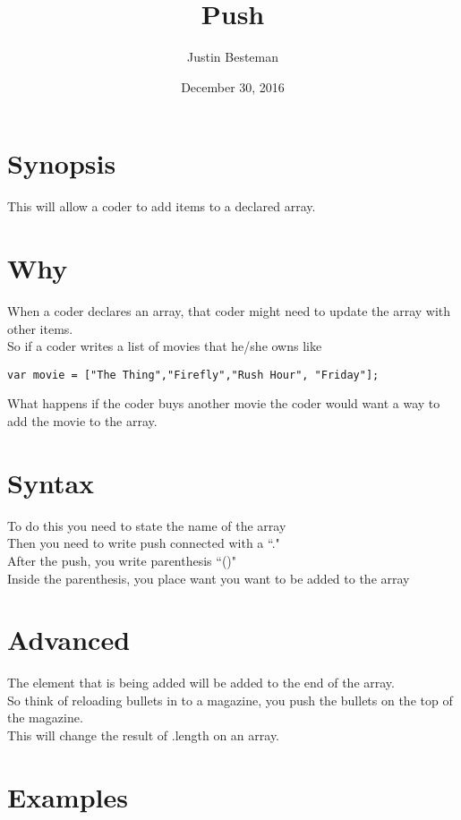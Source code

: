\documentclass[12pt, letterpaper]{article}
\title{Push}
\author{Justin Besteman}
\date{December 30, 2016}
\begin{document}
\maketitle

\section*{Synopsis}

This will allow a coder to add items to a declared array.

\section*{Why}

When a coder declares an array, that coder might need to update the array with other items. \\
So if a coder writes a list of movies that he/she owns like\\
\begin{lstlisting}
var movie = ["The Thing","Firefly","Rush Hour", "Friday"];
\end{lstlisting}
What happens if the coder buys another movie the coder would want a way to add the movie to the array.
\section*{Syntax}
To do this you need to state the name of the array\\
Then you need to write push connected with a ``." \\
After the push, you write parenthesis ``()"\\
Inside the parenthesis, you place want you want to be added to the array
\section*{Advanced}

The element that is being added will be added to the end of the array. \\
So think of reloading bullets in to a magazine, you push the bullets on the top of the magazine.\\
This will change the result of .length on an array. 

\section*{Examples}
\end{document}
